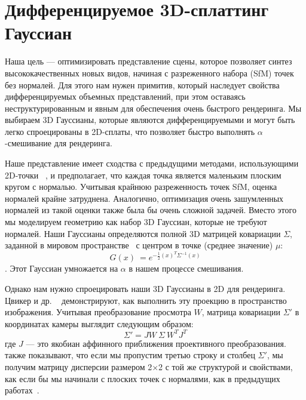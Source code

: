 \section{Дифференцируемое 3D-сплаттинг Гауссиан}
\label{sec:3d-splats}

Наша цель — оптимизировать представление сцены, которое позволяет синтез высококачественных новых видов, начиная с разреженного набора (SfM) точек без нормалей. Для этого нам нужен примитив, который наследует свойства дифференцируемых объемных представлений, при этом оставаясь неструктурированным и явным для обеспечения очень быстрого рендеринга. Мы выбираем 3D Гауссианы, которые являются дифференцируемыми и могут быть легко спроецированы в 2D-сплаты, что позволяет быстро выполнять $\alpha$-смешивание для рендеринга.

Наше представление имеет сходства с предыдущими методами, использующими 2D-точки ~\cite{yifan19,kopanas21}, и предполагает, что каждая точка является маленьким плоским кругом с нормалью.
Учитывая крайнюю разреженность точек SfM, оценка нормалей крайне затруднена. Аналогично, оптимизация очень зашумленных нормалей из такой оценки также была бы очень сложной задачей.
Вместо этого мы моделируем геометрию как набор 3D Гауссиан, которые не требуют нормалей. Наши Гауссианы определяются полной 3D матрицей ковариации $\Sigma$, заданной в мировом пространстве~\cite{zwicker2001ewa} с центром в точке (среднее значение) $\mu$:
\begin{equation}
    G(x)~= e^{-\frac{1}{2}(x)^{T}\Sigma^{-1}(x)}
\end{equation}
. Этот Гауссиан умножается на $\alpha$ в нашем процессе смешивания.

Однако нам нужно спроецировать наши 3D Гауссианы в 2D для рендеринга.
Цвикер и др. ~ демонстрируют, как выполнить эту проекцию в пространство изображения. Учитывая преобразование просмотра $W$,
матрица ковариации $\Sigma'$ в координатах камеры выглядит следующим образом:
\begin{equation}
    \label{eq:volume-render}
    \Sigma' = J W ~\Sigma ~W ^{T}J^{T}
\end{equation}
где $J$ — это якобиан аффинного приближения проективного преобразования.  также показывают, что если мы пропустим третью строку и столбец $\Sigma'$, 
мы получим матрицу дисперсии размером 2$\times$2 с той же структурой и свойствами, как если бы мы начинали с плоских точек с нормалями, как в предыдущих работах~\cite{kopanas21}.
    
